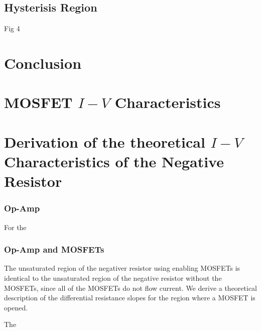 \documentclass[%
 aip,
amsmath,amssymb,
reprint,
]{revtex4-1}
\begin{document}
\subsection{Hysterisis Region}
Fig 4

\section{\label{sec:Conclusion} Conclusion}

\appendix

\section{\label{mosfetiv}MOSFET $I-V$ Characteristics}

\section{Derivation of the theoretical $I-V$ Characteristics of the Negative Resistor}
\subsubsection{\label{opampiv}Op-Amp}
For the 

\subsubsection{\label{opamp_mosfetiv}Op-Amp and MOSFETs}
The unsaturated region of the negativer resistor using enabling MOSFETs is identical to the unsaturated region of the negative resistor without the MOSFETs, since all of the MOSFETs do not flow current. We derive a theoretical description of the differential resistance slopes for the region where a MOSFET is opened. 

The 
\end{document}
